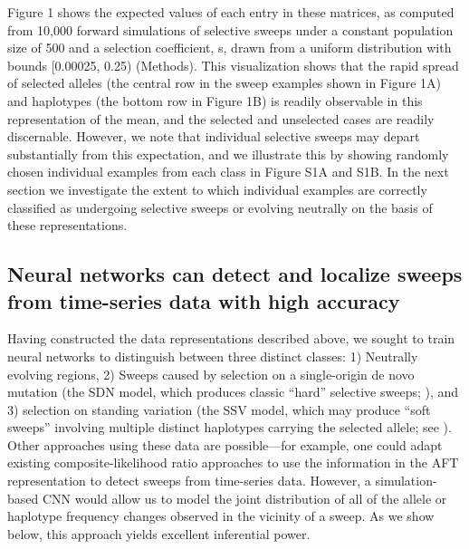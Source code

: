Figure 1 shows the expected values of each entry in these matrices, as computed from 10,000 forward simulations of selective sweeps under a constant population size of 500 and a selection coefficient, s, drawn from a uniform distribution with bounds [0.00025, 0.25) (Methods). This visualization shows that the rapid spread of selected alleles (the central row in the sweep examples shown in Figure 1A) and haplotypes (the bottom row in Figure 1B) is readily observable in this representation of the mean, and the selected and unselected cases are readily discernable. However, we note that individual selective sweeps may depart substantially from this expectation, and we illustrate this by showing randomly chosen individual examples from each class in Figure S1A and S1B. In the next section we investigate the extent to which individual examples are correctly classified as undergoing selective sweeps or evolving neutrally on the basis of these representations. \\

\subsection{Neural networks can detect and localize sweeps from time-series data with high accuracy}

Having constructed the data representations described above, we sought to train neural networks to distinguish between three distinct classes: 1) Neutrally evolving regions, 2) Sweeps caused by selection on a single-origin de novo mutation (the SDN model, which produces classic “hard” selective sweeps; \cite{smithHitchhikingEffectFavourable1974}), and 3) selection on standing variation (the SSV model, which may produce “soft sweeps” involving multiple distinct haplotypes carrying the selected allele; see \cite{hermissonSoftSweepsMolecular2005,orrHaldaneSieveAdaptation2001}). Other approaches using these data are possible—for example, one could adapt existing composite-likelihood ratio approaches \cite{nielsenGenomicScansSelective2005,vyCompositeLikelihoodMethodDetecting2015} to use the information in the AFT representation to detect sweeps from time-series data. However, a simulation-based CNN would allow us to model the joint distribution of all of the allele or haplotype frequency changes observed in the vicinity of a sweep. As we show below, this approach yields excellent inferential power. 

